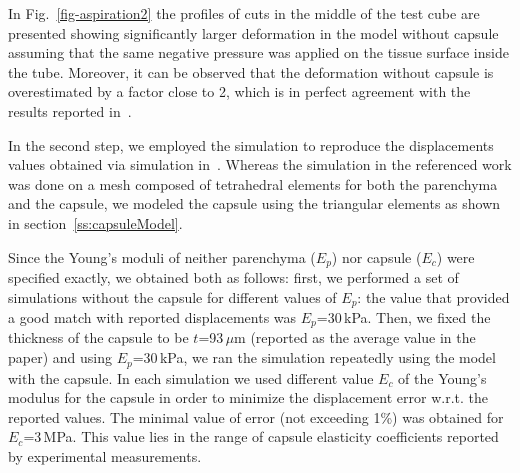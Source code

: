 \documentclass[final,3p,times,twocolumn]{elsarticle}
\begin{document}
%

In Fig.~\ref{fig-aspiration2} the profiles of cuts in the middle of the
test cube are presented showing significantly larger deformation in the model without capsule assuming that the same negative pressure was applied 
on the tissue surface inside the tube. Moreover, it can be observed that the deformation without capsule is overestimated by a factor 
close to 2, which is in perfect agreement with the results reported in~\cite{Hollenstein2006}.

In the second step, we employed the simulation to reproduce the displacements values obtained via simulation in~\cite{Hollenstein2006,Nava2008}.
Whereas the simulation in the referenced work was done on a mesh composed of tetrahedral elements for both the parenchyma 
and the capsule, we modeled the capsule using the triangular elements as shown in section~\ref{ss:capsuleModel}.

Since the Young's moduli of neither parenchyma ($E_p$) nor capsule ($E_c$) were specified exactly, we obtained both as follows: first, 
we performed a set of simulations without the capsule for different values of $E_p$: the value that provided a good match 
with reported displacements was $E_p$=30\,kPa. 
Then, we fixed the thickness of the capsule to be $t$=93\,$\mu$m (reported as the average value in the paper) and 
using $E_p$=30\,kPa, we ran the simulation repeatedly using the model with the capsule. In each simulation we 
used different value $E_c$ of the Young's modulus for the capsule in order to minimize the displacement error w.r.t. the 
reported values. The minimal value of error (not exceeding 1\%) was obtained for $E_c$=3\,MPa. This 
value lies in the range of capsule elasticity coefficients reported by experimental measurements.




\end{document}

